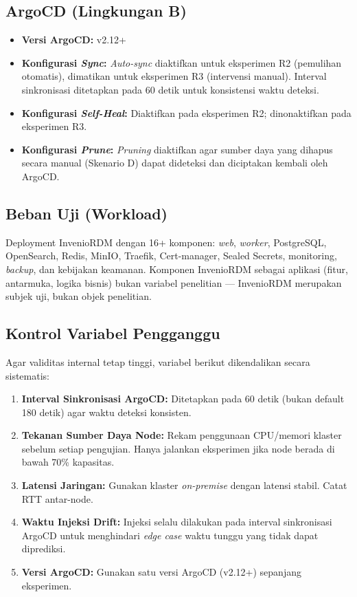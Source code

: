 \subsection{ArgoCD (Lingkungan B)}

\begin{itemize}
    \item \textbf{Versi ArgoCD:} v2.12+
    \item \textbf{Konfigurasi \textit{Sync}:} \textit{Auto-sync} diaktifkan untuk eksperimen R2 (pemulihan otomatis), dimatikan untuk eksperimen R3 (intervensi manual). Interval sinkronisasi ditetapkan pada 60 detik untuk konsistensi waktu deteksi.
    \item \textbf{Konfigurasi \textit{Self-Heal}:} Diaktifkan pada eksperimen R2; dinonaktifkan pada eksperimen R3.
    \item \textbf{Konfigurasi \textit{Prune}:} \textit{Pruning} diaktifkan agar sumber daya yang dihapus secara manual (Skenario D) dapat dideteksi dan diciptakan kembali oleh ArgoCD.
\end{itemize}

\subsection{Beban Uji (Workload)}

Deployment InvenioRDM dengan 16+ komponen: \textit{web}, \textit{worker}, PostgreSQL, OpenSearch, Redis, MinIO, Traefik, Cert-manager, Sealed Secrets, monitoring, \textit{backup}, dan kebijakan keamanan. Komponen InvenioRDM sebagai aplikasi (fitur, antarmuka, logika bisnis) bukan variabel penelitian --- InvenioRDM merupakan subjek uji, bukan objek penelitian.

\subsection{Kontrol Variabel Pengganggu}

Agar validitas internal tetap tinggi, variabel berikut dikendalikan secara sistematis:

\begin{enumerate}
    \item \textbf{Interval Sinkronisasi ArgoCD:} Ditetapkan pada 60 detik (bukan default 180 detik) agar waktu deteksi konsisten.
    
    \item \textbf{Tekanan Sumber Daya Node:} Rekam penggunaan CPU/memori klaster sebelum setiap pengujian. Hanya jalankan eksperimen jika node berada di bawah 70\% kapasitas.
    
    \item \textbf{Latensi Jaringan:} Gunakan klaster \textit{on-premise} dengan latensi stabil. Catat RTT antar-node.
    
    \item \textbf{Waktu Injeksi Drift:} Injeksi selalu dilakukan pada interval sinkronisasi ArgoCD untuk menghindari \textit{edge case} waktu tunggu yang tidak dapat diprediksi.
    
    \item \textbf{Versi ArgoCD:} Gunakan satu versi ArgoCD (v2.12+) sepanjang eksperimen.
\end{enumerate}

